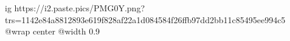  
 
 
 
 

\ifcmt
	ig https://i2.paste.pics/PMG0Y.png?trs=1142e84a8812893e619f828af22a1d084584f26ffb97dd2bb11c85495ee994c5
  @wrap center
  @width 0.9
\fi

